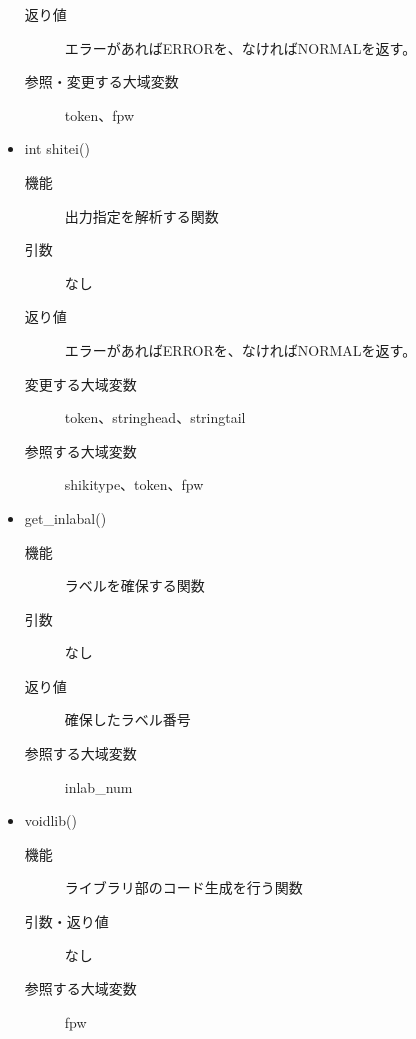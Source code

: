 \documentclass{jarticle}
\begin{document}
\begin{itemize}
\begin{description}
\item[返り値]エラーがあればERRORを、なければNORMALを返す。
\item[参照・変更する大域変数]token、fpw
\end{description}
\item int shitei()
\begin{description}
\item[機能]出力指定を解析する関数
\item[引数]なし
\item[返り値]エラーがあればERRORを、なければNORMALを返す。
\item[変更する大域変数]token、stringhead、stringtail
\item[参照する大域変数]shikitype、token、fpw
\end{description}
\item get\_inlabal()
\begin{description}
\item[機能]ラベルを確保する関数
\item[引数]なし
\item[返り値]確保したラベル番号
\item[参照する大域変数]inlab\_num
\end{description}
\item voidlib()
\begin{description}
\item[機能]ライブラリ部のコード生成を行う関数
\item[引数・返り値]なし
\item[参照する大域変数]fpw
\end{description}
\end{itemize}
\end{document}
